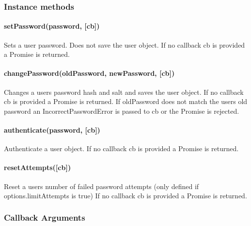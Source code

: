 \subsubsection*{Instance methods}

\paragraph*{set\+Password(password, \mbox{[}cb\mbox{]})}

Sets a user password. Does not save the user object. If no callback {\ttfamily cb} is provided a {\ttfamily Promise} is returned.

\paragraph*{change\+Password(old\+Password, new\+Password, \mbox{[}cb\mbox{]})}

Changes a user\textquotesingle{}s password hash and salt and saves the user object. If no callback {\ttfamily cb} is provided a {\ttfamily Promise} is returned. If old\+Password does not match the user\textquotesingle{}s old password an {\ttfamily Incorrect\+Password\+Error} is passed to {\ttfamily cb} or the {\ttfamily Promise} is rejected.

\paragraph*{authenticate(password, \mbox{[}cb\mbox{]})}

Authenticate a user object. If no callback {\ttfamily cb} is provided a {\ttfamily Promise} is returned.

\paragraph*{reset\+Attempts(\mbox{[}cb\mbox{]})}

Reset a user\textquotesingle{}s number of failed password attempts (only defined if {\ttfamily options.\+limit\+Attempts} is true) If no callback {\ttfamily cb} is provided a {\ttfamily Promise} is returned.

\subsubsection*{Callback Arguments}


